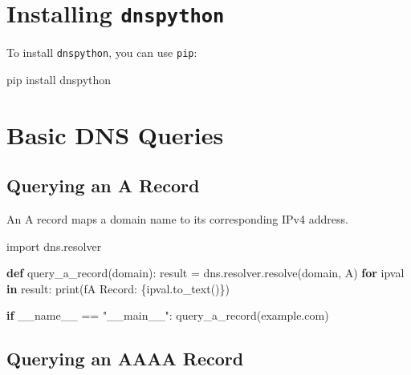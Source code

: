 \documentclass[
  letterpaper,
  DIV=11,
  numbers=noendperiod]{scrreprt}
\newenvironment{Shaded}{\begin{snugshade}}{\end{snugshade}}
\newcommand{\BuiltInTok}[1]{\textcolor[rgb]{0.00,0.23,0.31}{#1}}
\newcommand{\ControlFlowTok}[1]{\textcolor[rgb]{0.00,0.23,0.31}{\textbf{#1}}}
\newcommand{\ExtensionTok}[1]{\textcolor[rgb]{0.00,0.23,0.31}{#1}}
\newcommand{\ImportTok}[1]{\textcolor[rgb]{0.00,0.46,0.62}{#1}}
\newcommand{\KeywordTok}[1]{\textcolor[rgb]{0.00,0.23,0.31}{\textbf{#1}}}
\newcommand{\NormalTok}[1]{\textcolor[rgb]{0.00,0.23,0.31}{#1}}
\newcommand{\OperatorTok}[1]{\textcolor[rgb]{0.37,0.37,0.37}{#1}}
\newcommand{\SpecialCharTok}[1]{\textcolor[rgb]{0.37,0.37,0.37}{#1}}
\newcommand{\SpecialStringTok}[1]{\textcolor[rgb]{0.13,0.47,0.30}{#1}}
\newcommand{\StringTok}[1]{\textcolor[rgb]{0.13,0.47,0.30}{#1}}
\newcommand{\VariableTok}[1]{\textcolor[rgb]{0.07,0.07,0.07}{#1}}
\begin{document}
\section{\texorpdfstring{Installing
\texttt{dnspython}}{Installing dnspython}}\label{installing-dnspython-1}

To install \texttt{dnspython}, you can use \texttt{pip}:

\begin{Shaded}
\begin{Highlighting}[]
\ExtensionTok{pip}\NormalTok{ install dnspython}
\end{Highlighting}
\end{Shaded}

\section{Basic DNS Queries}\label{basic-dns-queries}

\subsection{Querying an A Record}\label{querying-an-a-record}

An A record maps a domain name to its corresponding IPv4 address.

\begin{Shaded}
\begin{Highlighting}[]
\ImportTok{import}\NormalTok{ dns.resolver}

\KeywordTok{def}\NormalTok{ query\_a\_record(domain):}
\NormalTok{    result }\OperatorTok{=}\NormalTok{ dns.resolver.resolve(domain, }\StringTok{\textquotesingle{}A\textquotesingle{}}\NormalTok{)}
    \ControlFlowTok{for}\NormalTok{ ipval }\KeywordTok{in}\NormalTok{ result:}
        \BuiltInTok{print}\NormalTok{(}\SpecialStringTok{f\textquotesingle{}A Record: }\SpecialCharTok{\{}\NormalTok{ipval}\SpecialCharTok{.}\NormalTok{to\_text()}\SpecialCharTok{\}}\SpecialStringTok{\textquotesingle{}}\NormalTok{)}

\ControlFlowTok{if} \VariableTok{\_\_name\_\_} \OperatorTok{==} \StringTok{"\_\_main\_\_"}\NormalTok{:}
\NormalTok{    query\_a\_record(}\StringTok{\textquotesingle{}example.com\textquotesingle{}}\NormalTok{)}
\end{Highlighting}
\end{Shaded}

\subsection{Querying an AAAA Record}\label{querying-an-aaaa-record}
\end{document}
